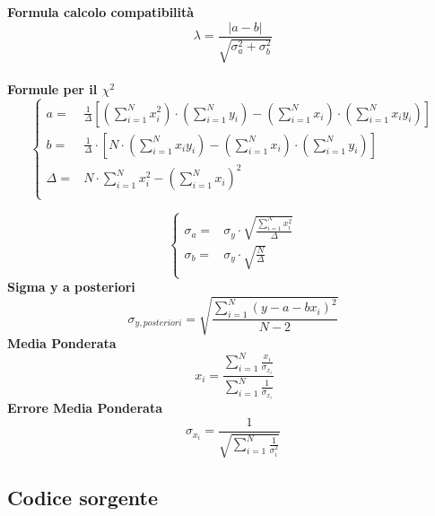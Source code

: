 \documentclass[a4paper,11pt,oneside]{article}
\begin{document}
\textbf{Formula calcolo compatibilità}\\
\begin{equation*}
    \lambda=\frac{\left|a-b\right|}{\sqrt{\sigma^{2}_{a}+\sigma^{2}_{b}}}
\end{equation*}\\

\textbf{Formule per il ${\chi}^2$}
\begin{equation*}
        \begin{cases}
    a=&\frac{1}{\Delta}[(\sum\limits_{i=1}^{N}{x_{i}^{2}})\cdot(\sum\limits_{i=1}^{N}{y_{i}})-(\sum\limits_{i=1}^{N}{x_{i}})\cdot(\sum\limits_{i=1}^{N}{x_{i}y_{i}})] \\ 
    b=&\frac{1}{\Delta }\cdot \left [N\cdot \left ( \sum\limits_{i=1}^{N}x_i y_i \right )-\left ( \sum\limits_{i=1}^{N}x_i \right )\cdot \left ( \sum\limits_{i=1}^{N}y_i \right )  \right ]\\
    \Delta=& N\cdot \sum\limits_{i=1}^{N} x_i^{2} - \left ( \sum\limits_{i=1}^{N}x_i \right )^{2}\\

    \end{cases}
\end{equation*}

\begin{equation*}
    \begin{cases}
    \sigma_{a}=&\sigma_{y}\cdot\sqrt{\frac{\sum_{i=1}^{N}{x_{i}^{2}}}{\Delta}} \\
    \sigma_{b}=&\sigma_y\cdot \sqrt{\frac{N}{\Delta }}\\
    \end{cases}
\end{equation*}
\textbf{Sigma y a posteriori}
\begin{equation*}
    \sigma_{y, posteriori}=\sqrt{\frac{\sum_{i=1}^{N}(y-a-bx_{i})^{2}}{N-2}}\label{eq:y_posteriori}
\end{equation*}
\textbf{Media Ponderata}
\begin{equation*}\
    x_i=\frac{\sum_{i=1}^{N}\frac{x_i}{\sigma_{x_i}}}{\sum_{i=1}^{N}\frac{1}{\sigma_{x_i}}} \label{eq:media_ponderata}
\end{equation*}
\textbf{Errore Media Ponderata}
\begin{equation*}
     \sigma_{x_i}=\frac{1}{\sqrt{\sum_{i=1}^{N}\frac{1}{\sigma_{i}^{2}}}}\label{eq:errore_media_pond}
\end{equation*}
\subsection{Codice sorgente}
\end{document}
